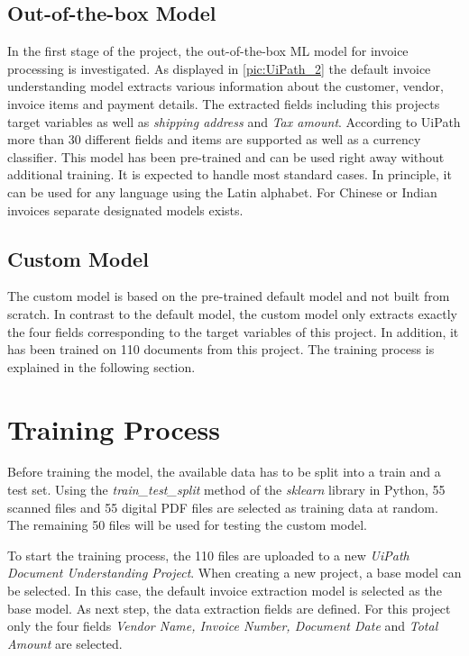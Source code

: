 \subsection*{Out-of-the-box Model}
In the first stage of the project, the out-of-the-box \acf{ML} model for invoice processing is investigated. As displayed in \cref{pic:UiPath_2} the default invoice understanding model extracts various information about the customer, vendor, invoice items and payment details. The extracted fields including this projects target variables as well as \textit{shipping address} and \textit{Tax amount}. According to UiPath \cite{uipathdoc} more than 30 different fields and items are supported as well as a currency classifier. This model has been pre-trained and can be used right away without additional training. It is expected to handle most standard cases. In principle, it can be used for any language using the Latin alphabet. For Chinese or Indian invoices separate designated models exists.
\subsection*{Custom Model}
The custom model is based on the pre-trained default model and not built from scratch. In contrast to the default model, the custom model only extracts exactly the four fields corresponding to the target variables of this project. In addition, it has been trained on 110 documents from this project. The training process is explained in the following section.

\newpage
\section{Training Process}

Before training the model, the available data has to be split into a train and a test set. Using the \textit{train\_test\_split} method of the \textit{sklearn} library in Python, 55 scanned files and 55 digital PDF files are selected as training data at random. The remaining 50 files will be used for testing the custom model.

To start the training process, the 110 files are uploaded to a new \textit{UiPath Document Understanding Project}. When creating a new project, a base model can be selected. In this case, the default invoice extraction model is selected as the base model. As next step, the data extraction fields are defined. For this project only the four fields \textit{Vendor Name, Invoice Number, Document Date} and \textit{Total Amount} are selected.

